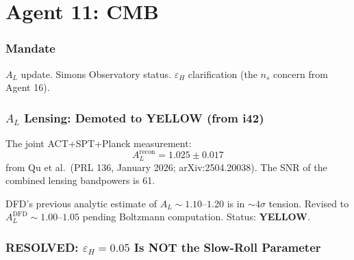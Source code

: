 \documentclass[11pt,a4paper]{article}
\newcommand{\YELLOW}{\textcolor{dfdyellow}{\textbf{YELLOW}}}
\newcommand{\RESOLVED}{\textcolor{dfdgreen}{\textbf{RESOLVED}}}
\begin{document}
\part{Agent 11: CMB}
\label{part:agent11}

\section{Mandate}

$A_L$ update. Simons Observatory status. $\varepsilon_H$ clarification (the $n_s$ concern from Agent 16).

\section{$A_L$ Lensing: Demoted to YELLOW (from i42)}

The joint ACT+SPT+Planck measurement:
\begin{equation}
A_L^{\text{recon}} = 1.025 \pm 0.017
\end{equation}
from Qu et al.\ (PRL 136, January 2026; arXiv:2504.20038). The SNR of the combined lensing bandpowers is 61.

DFD's previous analytic estimate of $A_L \sim 1.10$--$1.20$ is in $\sim 4\sigma$ tension. Revised to $A_L^{\text{DFD}} \sim 1.00$--$1.05$ pending Boltzmann computation. Status: \YELLOW.

\section{\RESOLVED: $\varepsilon_H = 0.05$ Is NOT the Slow-Roll Parameter}
\label{sec:epsilon_H_resolution}
\end{document}
